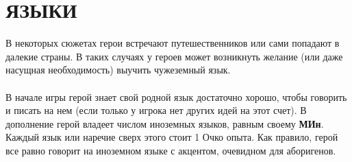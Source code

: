 \section{ЯЗЫКИ}
В некоторых сюжетах герои встречают путешественников или сами попадают в далекие страны. В таких случаях у героев может возникнуть желание (или даже насущная необходимость) выучить чужеземный язык.
\paragraph{}
В начале игры герой знает свой родной язык достаточно хорошо, чтобы говорить и писать на нем (если только у игрока нет других идей на этот счет). В дополнение герой владеет числом иноземных языков, равным своему \textbf{МИн}. Каждый язык или наречие сверх этого стоит 1 Очко опыта. Как правило, герой все равно говорит на иноземном языке с акцентом, очевидном для аборигенов.